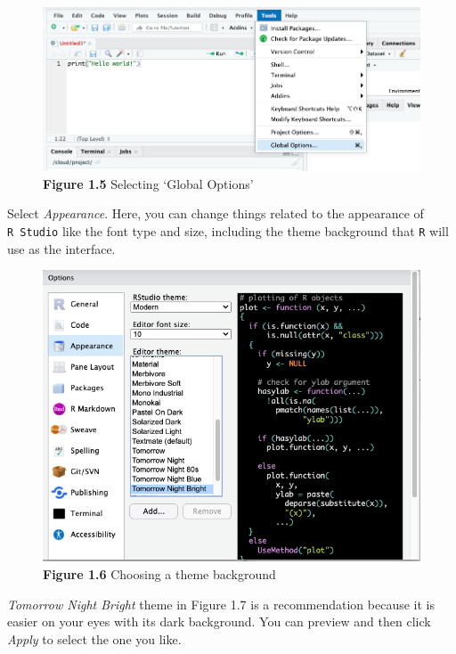 \documentclass[
]{book}
\begin{document}
\begin{figure}
\centering
\includegraphics{Images/tools_global_options.png}
\caption{\textbf{Figure 1.5} Selecting `Global Options'}
\end{figure}

Select \emph{Appearance}. Here, you can change things related to the appearance of \texttt{R\ Studio} like the font type and size, including the theme background that \texttt{R} will use as the interface.

\begin{figure}
\centering
\includegraphics{Images/appearance_choose_tomorrow_night_bright.png}
\caption{\textbf{Figure 1.6} Choosing a theme background}
\end{figure}

\emph{Tomorrow Night Bright} theme in Figure 1.7 is a recommendation because it is easier on your eyes with its dark background. You can preview and then click \emph{Apply} to select the one you like.
\end{document}
